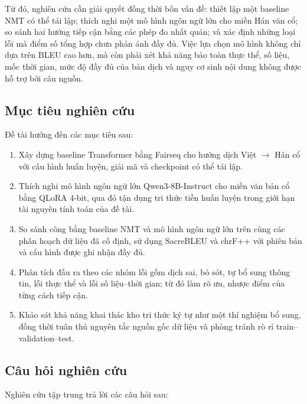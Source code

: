Từ đó, nghiên cứu cần giải quyết đồng thời bốn vấn đề: thiết lập một baseline NMT có thể tái lập; thích nghi một mô hình ngôn ngữ lớn cho miền Hán văn cổ; so sánh hai hướng tiếp cận bằng các phép đo nhất quán; và xác định những loại lỗi mà điểm số tổng hợp chưa phản ánh đầy đủ. Việc lựa chọn mô hình không chỉ dựa trên BLEU cao hơn, mà còn phải xét khả năng bảo toàn thực thể, số liệu, mốc thời gian, mức độ đầy đủ của bản dịch và nguy cơ sinh nội dung không được hỗ trợ bởi câu nguồn.

\subsection{Mục tiêu nghiên cứu}

Đề tài hướng đến các mục tiêu sau:

\begin{enumerate}
    \item Xây dựng baseline Transformer bằng Fairseq cho hướng dịch Việt $\rightarrow$ Hán cổ với cấu hình huấn luyện, giải mã và checkpoint có thể tái lập.
    \item Thích nghi mô hình ngôn ngữ lớn Qwen3-8B-Instruct cho miền văn bản cổ bằng QLoRA 4-bit, qua đó tận dụng tri thức tiền huấn luyện trong giới hạn tài nguyên tính toán của đề tài.
    \item So sánh công bằng baseline NMT và mô hình ngôn ngữ lớn trên cùng các phân hoạch dữ liệu đã cố định, sử dụng SacreBLEU và chrF++ với phiên bản và cấu hình được ghi nhận đầy đủ.
    \item Phân tích đầu ra theo các nhóm lỗi gồm dịch sai, bỏ sót, tự bổ sung thông tin, lỗi thực thể và lỗi số liệu--thời gian; từ đó làm rõ ưu, nhược điểm của từng cách tiếp cận.
    \item Khảo sát khả năng khai thác kho tri thức ký tự như một thí nghiệm bổ sung, đồng thời tuân thủ nguyên tắc nguồn gốc dữ liệu và phòng tránh rò rỉ train--validation--test.
\end{enumerate}

\subsection{Câu hỏi nghiên cứu}

Nghiên cứu tập trung trả lời các câu hỏi sau:

